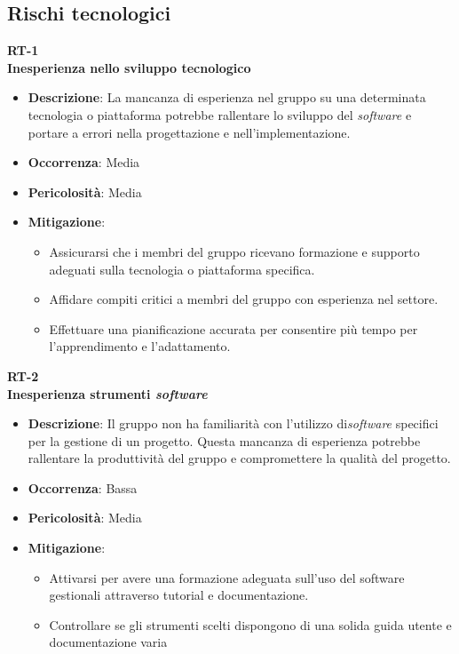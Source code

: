 \documentclass[5pt]{article}
\begin{document}
\subsection{Rischi tecnologici}
\textbf{RT-1} \\
\textbf{Inesperienza nello sviluppo tecnologico}
\begin{itemize}
  \item \textbf{Descrizione}: La mancanza di esperienza nel gruppo su una determinata tecnologia o piattaforma potrebbe rallentare lo sviluppo del \textit{software} e portare a errori nella progettazione e nell'implementazione.
  \item \textbf{Occorrenza}: Media
  \item \textbf{Pericolosità}: Media
  \item \textbf{Mitigazione}: 
    \begin{itemize}
      \item Assicurarsi che i membri del gruppo ricevano formazione e supporto adeguati sulla tecnologia o piattaforma specifica.
      \item Affidare compiti critici a membri del gruppo con esperienza nel settore.
      \item Effettuare una pianificazione accurata per consentire più tempo per l'apprendimento e l'adattamento.
      \end{itemize}
\end{itemize}
\textbf{RT-2} \\
\textbf{Inesperienza strumenti \textit{software}}
\begin{itemize}
  \item \textbf{Descrizione}: Il gruppo non ha familiarità con l'utilizzo di\textit{software} specifici per la gestione di un progetto. Questa mancanza di esperienza potrebbe rallentare la produttività del gruppo e compromettere la qualità del progetto.
  \item \textbf{Occorrenza}: Bassa
  \item \textbf{Pericolosità}: Media
  \item \textbf{Mitigazione}: 
    \begin{itemize}
      \item  Attivarsi per avere una formazione adeguata sull'uso del software gestionali attraverso tutorial e documentazione.
      \item Controllare se gli strumenti scelti dispongono di una solida guida utente e documentazione varia
    \end{itemize}
\end{itemize}
\end{document}
